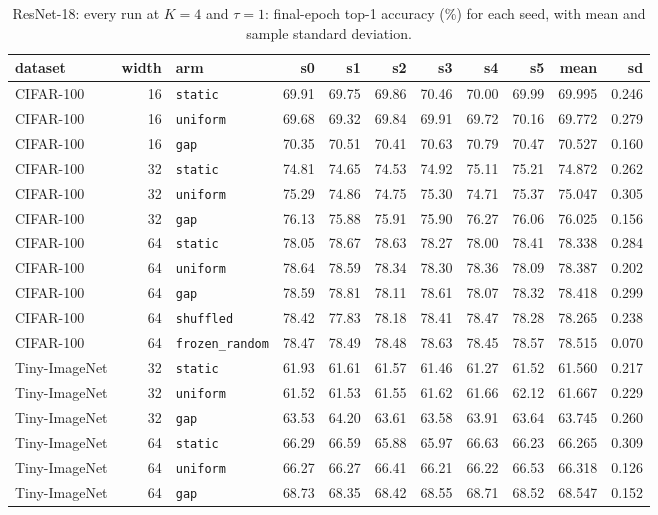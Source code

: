 \documentclass[10pt,a4paper]{article}
\begin{document}
\begin{table}[h]\centering\scriptsize
\caption{ResNet-18: every run at $K=4$ and $\tau=1$: final-epoch top-1 accuracy
(\si{\percent}) for each seed, with mean and sample standard deviation.}
\label{tab:allruns}
\begin{tabular}{l r l rrrrrr rr}
\toprule
dataset & width & arm & s0 & s1 & s2 & s3 & s4 & s5 & mean & sd \\
\midrule
CIFAR-100 & 16 & \texttt{static} & 69.91 & 69.75 & 69.86 & 70.46 & 70.00 & 69.99 & 69.995 & 0.246 \\
CIFAR-100 & 16 & \texttt{uniform} & 69.68 & 69.32 & 69.84 & 69.91 & 69.72 & 70.16 & 69.772 & 0.279 \\
CIFAR-100 & 16 & \texttt{gap} & 70.35 & 70.51 & 70.41 & 70.63 & 70.79 & 70.47 & 70.527 & 0.160 \\
CIFAR-100 & 32 & \texttt{static} & 74.81 & 74.65 & 74.53 & 74.92 & 75.11 & 75.21 & 74.872 & 0.262 \\
CIFAR-100 & 32 & \texttt{uniform} & 75.29 & 74.86 & 74.75 & 75.30 & 74.71 & 75.37 & 75.047 & 0.305 \\
CIFAR-100 & 32 & \texttt{gap} & 76.13 & 75.88 & 75.91 & 75.90 & 76.27 & 76.06 & 76.025 & 0.156 \\
CIFAR-100 & 64 & \texttt{static} & 78.05 & 78.67 & 78.63 & 78.27 & 78.00 & 78.41 & 78.338 & 0.284 \\
CIFAR-100 & 64 & \texttt{uniform} & 78.64 & 78.59 & 78.34 & 78.30 & 78.36 & 78.09 & 78.387 & 0.202 \\
CIFAR-100 & 64 & \texttt{gap} & 78.59 & 78.81 & 78.11 & 78.61 & 78.07 & 78.32 & 78.418 & 0.299 \\
CIFAR-100 & 64 & \texttt{shuffled} & 78.42 & 77.83 & 78.18 & 78.41 & 78.47 & 78.28 & 78.265 & 0.238 \\
CIFAR-100 & 64 & \texttt{frozen\_random} & 78.47 & 78.49 & 78.48 & 78.63 & 78.45 & 78.57 & 78.515 & 0.070 \\
Tiny-ImageNet & 32 & \texttt{static} & 61.93 & 61.61 & 61.57 & 61.46 & 61.27 & 61.52 & 61.560 & 0.217 \\
Tiny-ImageNet & 32 & \texttt{uniform} & 61.52 & 61.53 & 61.55 & 61.62 & 61.66 & 62.12 & 61.667 & 0.229 \\
Tiny-ImageNet & 32 & \texttt{gap} & 63.53 & 64.20 & 63.61 & 63.58 & 63.91 & 63.64 & 63.745 & 0.260 \\
Tiny-ImageNet & 64 & \texttt{static} & 66.29 & 66.59 & 65.88 & 65.97 & 66.63 & 66.23 & 66.265 & 0.309 \\
Tiny-ImageNet & 64 & \texttt{uniform} & 66.27 & 66.27 & 66.41 & 66.21 & 66.22 & 66.53 & 66.318 & 0.126 \\
Tiny-ImageNet & 64 & \texttt{gap} & 68.73 & 68.35 & 68.42 & 68.55 & 68.71 & 68.52 & 68.547 & 0.152 \\
\bottomrule
\end{tabular}
\end{table}
\end{document}
